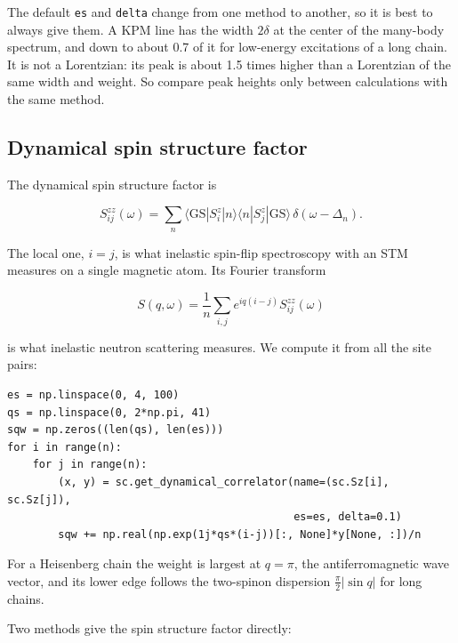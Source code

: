 \documentclass[11pt]{article}
\begin{document}
The default \texttt{es} and \texttt{delta} change from one method to another, so it is
best to always give them. A KPM line has the width \(2\delta\) at the
center of the many-body spectrum, and down to about 0.7 of it for low-energy
excitations of a long chain. It is not a Lorentzian: its peak is about 1.5
times higher than a Lorentzian of the same width and weight. So compare
peak heights only between calculations with the same method.

\subsection{Dynamical spin structure factor}

The dynamical spin structure factor is

\[S^{zz}_{ij}(\omega)=\sum_n\langle\mathrm{GS}|S^z_i|n\rangle\langle n|S^z_j|\mathrm{GS}\rangle\,\delta(\omega-\Delta_n).\]

The local one, \(i=j\), is what inelastic spin-flip spectroscopy with an STM
measures on a single magnetic atom. Its Fourier transform

\[S(q,\omega)=\frac1n\sum_{i,j}e^{iq(i-j)}S^{zz}_{ij}(\omega)\]

is what inelastic neutron scattering measures. We compute it from all the
site pairs:

\begin{lstlisting}
es = np.linspace(0, 4, 100)
qs = np.linspace(0, 2*np.pi, 41)
sqw = np.zeros((len(qs), len(es)))
for i in range(n):
    for j in range(n):
        (x, y) = sc.get_dynamical_correlator(name=(sc.Sz[i], sc.Sz[j]),
                                             es=es, delta=0.1)
        sqw += np.real(np.exp(1j*qs*(i-j))[:, None]*y[None, :])/n
\end{lstlisting}

For a Heisenberg chain the weight is largest at \(q=\pi\), the
antiferromagnetic wave vector, and its lower edge follows the two-spinon
dispersion \(\frac{\pi}{2}|\sin q|\) for long chains.

Two methods give the spin structure factor directly:
\end{document}
